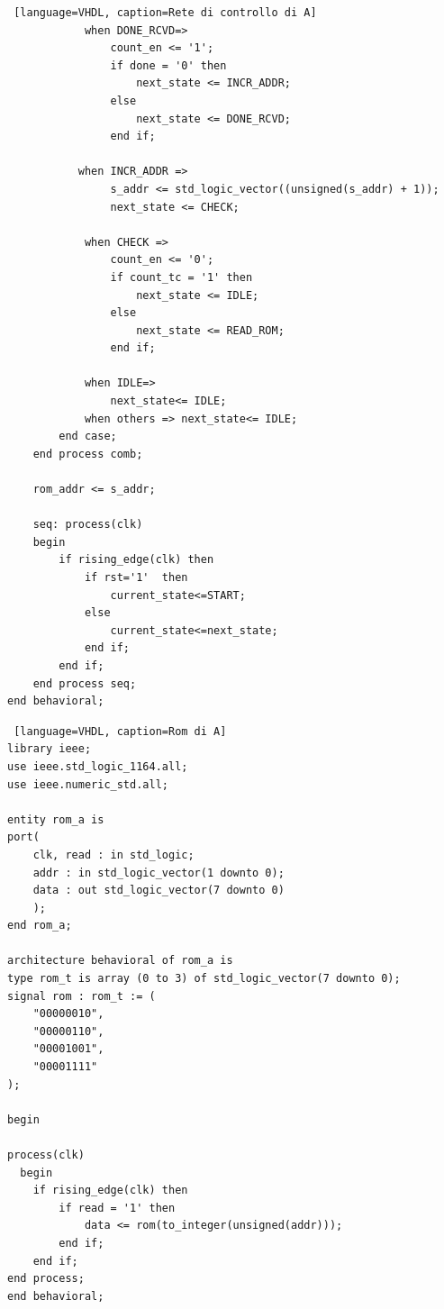 \begin{lstlisting} [language=VHDL, caption=Rete di controllo di A]
            when DONE_RCVD=>
                count_en <= '1';
                if done = '0' then
                    next_state <= INCR_ADDR;
                else 
                    next_state <= DONE_RCVD;
                end if;

           when INCR_ADDR =>
                s_addr <= std_logic_vector((unsigned(s_addr) + 1));
                next_state <= CHECK;
    
            when CHECK =>
                count_en <= '0';
                if count_tc = '1' then
                    next_state <= IDLE;
                else
                    next_state <= READ_ROM;
                end if;

            when IDLE=>
                next_state<= IDLE;
            when others => next_state<= IDLE;
        end case;
    end process comb;

    rom_addr <= s_addr;

    seq: process(clk)
    begin
        if rising_edge(clk) then
            if rst='1'  then
                current_state<=START;
            else
                current_state<=next_state;
            end if;
        end if;
    end process seq;
end behavioral;
\end{lstlisting}

\begin{lstlisting} [language=VHDL, caption=Rom di A]
library ieee;
use ieee.std_logic_1164.all;
use ieee.numeric_std.all;

entity rom_a is
port(
    clk, read : in std_logic; 
    addr : in std_logic_vector(1 downto 0);
    data : out std_logic_vector(7 downto 0)
    );
end rom_a;

architecture behavioral of rom_a is 
type rom_t is array (0 to 3) of std_logic_vector(7 downto 0);
signal rom : rom_t := (
    "00000010", 
    "00000110", 
    "00001001", 
    "00001111"
);

begin

process(clk)
  begin
    if rising_edge(clk) then
        if read = '1' then
            data <= rom(to_integer(unsigned(addr)));
        end if;
    end if;
end process;
end behavioral;
\end{lstlisting}

